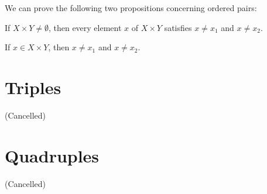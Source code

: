 \documentclass{article}
\begin{document}
We can prove the following two propositions concerning ordered pairs:
\begin{thm}
\item\label{mcart1:62} If $X\times Y\neq\emptyset$, then every element
  $x$ of $X\times Y$ satisfies $x\neq x_{1}$ and $x\neq x_{2}$.
\item\label{mcart1:63} If $x\in X\times Y$,
  then $x\neq x_{1}$ and $x\neq x_{2}$.
\end{thm}

\section{Triples}

\begin{thm}
\item\label{mcart1:64} 
\item\label{mcart1:65} 
\item\label{mcart1:66} 
\item\label{mcart1:67} 
\item\label{mcart1:68} 
\item\label{mcart1:69} 
\item\label{mcart1:70} 
\item\label{mcart1:71} (Cancelled)
\item\label{mcart1:72} 
\item\label{mcart1:73} 
\end{thm}

\section{Quadruples}

\begin{thm}
\item\label{mcart1:74} 
\item\label{mcart1:75} 
\item\label{mcart1:76} 
\item\label{mcart1:77} 
\item\label{mcart1:78} 
\item\label{mcart1:79} 
\item\label{mcart1:80} 
\item\label{mcart1:81} 
\item\label{mcart1:82} (Cancelled)
\item\label{mcart1:83} 
\item\label{mcart1:84} 
\item\label{mcart1:85} 
\item\label{mcart1:86} 
\item\label{mcart1:87} 
\item\label{mcart1:88} 
\item\label{mcart1:89} 
\item\label{mcart1:90} 
\item\label{mcart1:91} 
\item\label{mcart1:92} 
\item\label{mcart1:93} 
\end{thm}
\end{document}
